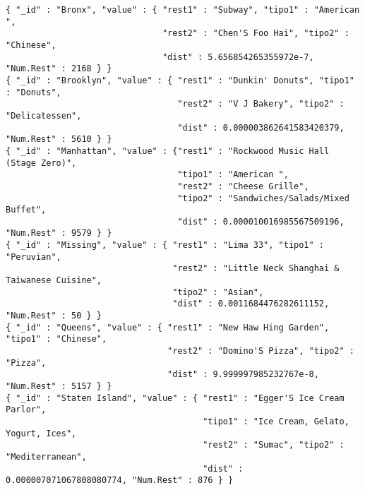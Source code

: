 \documentclass[11pt]{article}
\begin{document}
\begin{verbatim}
{ "_id" : "Bronx", "value" : { "rest1" : "Subway", "tipo1" : "American ", 
							   "rest2" : "Chen'S Foo Hai", "tipo2" : "Chinese", 
							   "dist" : 5.656854265355972e-7, "Num.Rest" : 2168 } }
{ "_id" : "Brooklyn", "value" : { "rest1" : "Dunkin' Donuts", "tipo1" : "Donuts", 
								  "rest2" : "V J Bakery", "tipo2" : "Delicatessen", 
								  "dist" : 0.000003862641583420379, "Num.Rest" : 5610 } }
{ "_id" : "Manhattan", "value" : {"rest1" : "Rockwood Music Hall (Stage Zero)", 
								  "tipo1" : "American ", 
								  "rest2" : "Cheese Grille", 
								  "tipo2" : "Sandwiches/Salads/Mixed Buffet", 
								  "dist" : 0.000010016985567509196, "Num.Rest" : 9579 } }
{ "_id" : "Missing", "value" : { "rest1" : "Lima 33", "tipo1" : "Peruvian", 
								 "rest2" : "Little Neck Shanghai & Taiwanese Cuisine", 
								 "tipo2" : "Asian", 
								 "dist" : 0.0011684476282611152, "Num.Rest" : 50 } }
{ "_id" : "Queens", "value" : { "rest1" : "New Haw Hing Garden", "tipo1" : "Chinese", 
								"rest2" : "Domino'S Pizza", "tipo2" : "Pizza", 
								"dist" : 9.999997985232767e-8, "Num.Rest" : 5157 } }
{ "_id" : "Staten Island", "value" : { "rest1" : "Egger'S Ice Cream Parlor", 
									   "tipo1" : "Ice Cream, Gelato, Yogurt, Ices", 
									   "rest2" : "Sumac", "tipo2" : "Mediterranean", 
									   "dist" : 0.000007071067808080774, "Num.Rest" : 876 } }
\end{verbatim}
\end{document}
